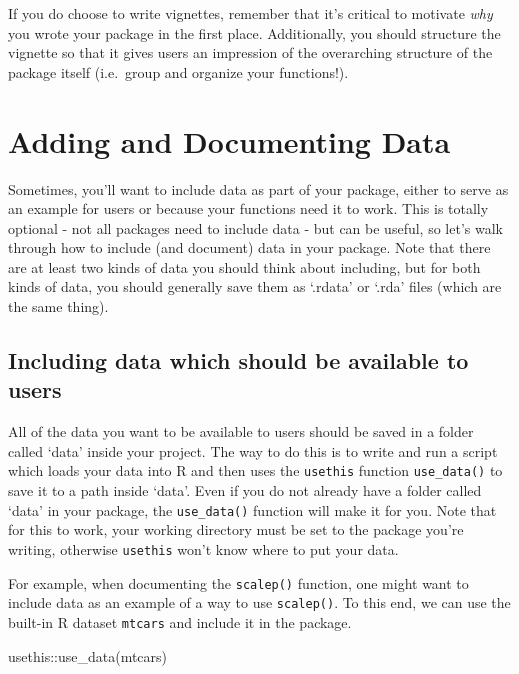 \documentclass[
]{book}
\newenvironment{Shaded}{\begin{snugshade}}{\end{snugshade}}
\newcommand{\FunctionTok}[1]{\textcolor[rgb]{0.00,0.00,0.00}{#1}}
\newcommand{\NormalTok}[1]{#1}
\newcommand{\SpecialCharTok}[1]{\textcolor[rgb]{0.00,0.00,0.00}{#1}}
\begin{document}
If you do choose to write vignettes, remember that it's critical to motivate \emph{why} you wrote your package in the first place. Additionally, you should structure the vignette so that it gives users an impression of the overarching structure of the package itself (i.e.~group and organize your functions!).

\hypertarget{adding-and-documenting-data}{%
\section{Adding and Documenting Data}\label{adding-and-documenting-data}}

Sometimes, you'll want to include data as part of your package, either to serve as an example for users or because your functions need it to work. This is totally optional - not all packages need to include data - but can be useful, so let's walk through how to include (and document) data in your package. Note that there are at least two kinds of data you should think about including, but for both kinds of data, you should generally save them as `.rdata' or `.rda' files (which are the same thing).

\hypertarget{including-data-which-should-be-available-to-users}{%
\subsection{Including data which should be available to users}\label{including-data-which-should-be-available-to-users}}

All of the data you want to be available to users should be saved in a folder called `data' inside your project. The way to do this is to write and run a script which loads your data into R and then uses the \texttt{usethis} function \texttt{use\_data()} to save it to a path inside `data'. Even if you do not already have a folder called `data' in your package, the \texttt{use\_data()} function will make it for you. Note that for this to work, your working directory must be set to the package you're writing, otherwise \texttt{usethis} won't know where to put your data.

For example, when documenting the \texttt{scalep()} function, one might want to include data as an example of a way to use \texttt{scalep()}. To this end, we can use the built-in R dataset \texttt{mtcars} and include it in the package.

\begin{Shaded}
\begin{Highlighting}[]
\NormalTok{usethis}\SpecialCharTok{::}\FunctionTok{use\_data}\NormalTok{(mtcars)}
\end{Highlighting}
\end{Shaded}
\end{document}
